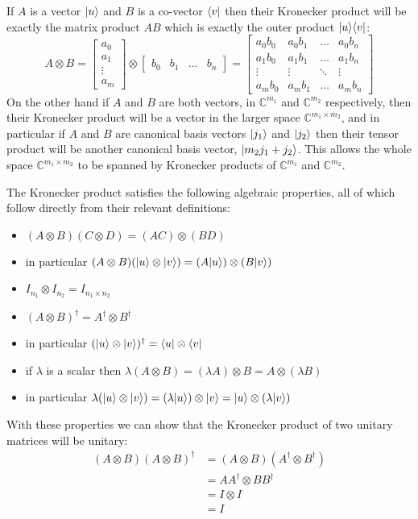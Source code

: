 If $A$ is a vector $| u \rangle$ and $B$ is a co-vector $\langle v |$ then their Kronecker product will be exactly the matrix product $AB$ which is exactly the outer product $| u \rangle\langle v |$:
\[
A \otimes B =
\left[\begin{matrix}
a_0\\a_1\\\vdots\\a_m
\end{matrix}\right]
\otimes
\left[\begin{matrix}
b_0&b_1&\dots&b_n
\end{matrix}\right]
=
\left[\begin{matrix}
a_0b_0 & a_0b_1 & \dots & a_0b_n\\
a_1b_0 & a_1b_1 & \dots & a_1b_n\\
\vdots & \vdots & \ddots & \vdots\\
a_mb_0 & a_mb_1 & \dots & a_mb_n
\end{matrix}\right]
\]
On the other hand if $A$ and $B$ are both vectors, in $\mathbb{C}^{m_1}$ and $\mathbb{C}^{m_2}$ respectively, then their Kronecker product will be a vector in the larger space $\mathbb{C}^{m_1\times m_2}$, and in particular if $A$ and $B$ are canonical basis vectors $| j_1 \rangle$ and $| j_2 \rangle$ then their tensor product will be another canonical basis vector, $| m_2j_1 + j_2 \rangle$. This allows the whole space $\mathbb{C}^{m_1 \times m_2}$ to be spanned by Kronecker products of $\mathbb{C}^{m_1}$ and $\mathbb{C}^{m_2}$.

The Kronecker product satisfies the following algebraic properties, all of which follow directly from their relevant definitions:
\begin{itemize}
	\item $(A\otimes B)(C \otimes D) = (AC) \otimes (BD)$
	\item in particular $(A\otimes B)(| u \rangle \otimes | v \rangle) = (A| u \rangle)\otimes (B| v \rangle)$
	\item $I_{n_1} \otimes I_{n_2} = I_{n_1\times n_2}$
	\item $(A\otimes B)^\dagger = A^\dagger \otimes B^\dagger$
	\item in particular $(| u \rangle\otimes | v \rangle)^\dagger = \langle u | \otimes \langle v |$
	\item if $\lambda$ is a scalar then $\lambda (A \otimes B) = (\lambda A) \otimes B = A \otimes (\lambda B)$
	\item in particular $\lambda (| u \rangle \otimes | v \rangle) = (\lambda | u \rangle) \otimes | v \rangle = | u \rangle \otimes (\lambda | v \rangle)$
\end{itemize}
With these properties we can show that the Kronecker product of two unitary matrices will be unitary:
\begin{align*}
(A \otimes B)(A \otimes B)^\dagger
&= (A \otimes B)(A^\dagger \otimes B^\dagger)
\\&= AA^\dagger \otimes BB^\dagger
\\&= I \otimes I
\\&= I
\end{align*}

